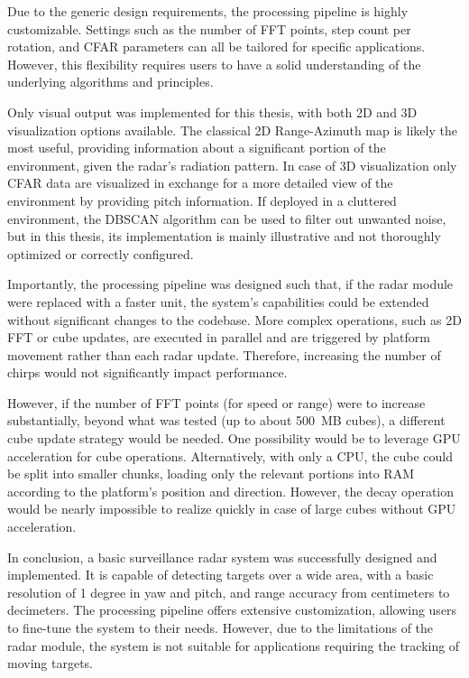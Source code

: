 Due to the generic design requirements, the processing pipeline is highly customizable.
Settings such as the number of FFT points, step count per rotation, and CFAR parameters can all be tailored for specific applications.
However, this flexibility requires users to have a solid understanding of the underlying algorithms and principles.

Only visual output was implemented for this thesis, with both 2D and 3D visualization options available.
The classical 2D Range-Azimuth map is likely the most useful, providing information about a significant portion of the environment, given the radar’s radiation pattern.
In case of 3D visualization only CFAR data are visualized in exchange for a more detailed view of the environment by providing pitch information.
If deployed in a cluttered environment, the DBSCAN algorithm can be used to filter out unwanted noise, but in this thesis, its implementation is mainly illustrative and not thoroughly optimized or correctly configured.

Importantly, the processing pipeline was designed such that, if the radar module were replaced with a faster unit, the system’s capabilities could be extended without significant changes to the codebase.
More complex operations, such as 2D FFT or cube updates, are executed in parallel and are triggered by platform movement rather than each radar update.
Therefore, increasing the number of chirps would not significantly impact performance.

However, if the number of FFT points (for speed or range) were to increase substantially, beyond what was tested (up to about 500~MB cubes), a different cube update strategy would be needed.
 One possibility would be to leverage GPU acceleration for cube operations.
Alternatively, with only a CPU, the cube could be split into smaller chunks, loading only the relevant portions into RAM according to the platform’s position and direction.
However, the decay operation would be nearly impossible to realize quickly in case of large cubes without GPU acceleration.

In conclusion, a basic surveillance radar system was successfully designed and implemented.
It is capable of detecting targets over a wide area, with a basic resolution of 1 degree in yaw and pitch, and range accuracy from centimeters to decimeters.
The processing pipeline offers extensive customization, allowing users to fine-tune the system to their needs.
However, due to the limitations of the radar module, the system is not suitable for applications requiring the tracking of moving targets.
